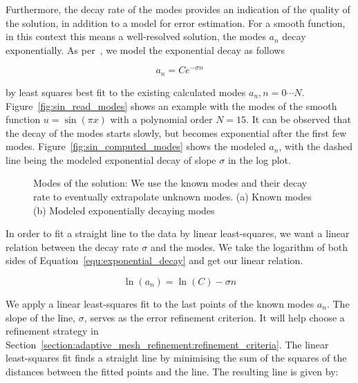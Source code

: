 Furthermore, the decay rate of the modes provides an indication of the quality of the solution, in
addition to a model for error estimation. For a smooth function, in this context this means a
well-resolved solution, the modes \(a_n\) decay exponentially. As per~\cite{Mavriplis1990}, we model
the exponential decay as follows

\begin{equation} \label{equ:exponential_decay}
    a_n = Ce^{-\sigma n}
\end{equation}

\noindent
by least squares best fit to the existing calculated modes \(a_n, n = 0 \cdots N\).
Figure~\ref{fig:sin_read_modes} shows an example with the modes of the smooth function \(u =
\sin(\pi x)\) with a polynomial order \(N = 15\). It can be observed that the decay of the modes
starts slowly, but becomes exponential after the first few modes.
Figure~\ref{fig:sin_computed_modes} shows the modeled \(a_n\), with the dashed line being the
modeled exponential decay of slope \( \sigma \) in the log plot.

\begin{figure}[H]
    \centering
    \hfill
    \caption{Modes of the solution: We use the known modes and their decay rate to eventually
        extrapolate unknown modes. (a) Known modes (b) Modeled exponentially decaying modes}\label{fig:sin_modes}
\end{figure}

In order to fit a straight line to the data by linear least-squares, we want a linear relation
between the decay rate \(\sigma \) and the modes. We take the logarithm of both sides of
Equation~\ref{equ:exponential_decay} and get our linear relation.

\begin{equation} \label{equ:exponential_decay_linear}
    \ln(a_n) = \ln(C) - \sigma n
\end{equation}

\noindent
We apply a linear least-squares fit to the last points of the known modes \(a_n\). The slope of the
line, \(\sigma \), serves as the error refinement criterion. It will help choose a refinement
strategy in Section~\ref{section:adaptive_mesh_refinement:refinement_criteria}. The linear
least-squares fit finds a straight line by minimising the sum of the squares of the distances
between the fitted points and the line. The resulting line is given by:

